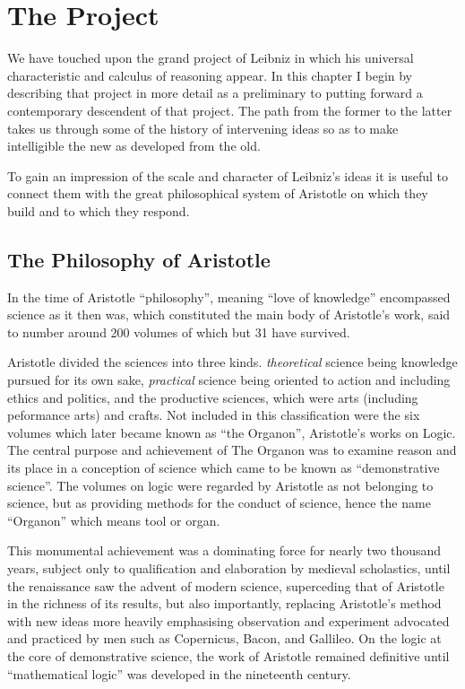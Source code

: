 
\chapter{The Project}\label{TheProject}

We have touched upon the grand project of Leibniz in which his universal characteristic
and calculus of reasoning appear.
In this chapter I begin by describing that project in more detail as a preliminary
to putting forward a contemporary descendent of that project.
The path from the former to the latter takes us through some of the history of
intervening ideas so as to make intelligible the new as developed from the old.

To gain an impression of the scale and character of Leibniz's ideas it is useful to connect them with
the great philosophical system of Aristotle on which they build and to which they respond.

\section{The Philosophy of Aristotle}

In the time of Aristotle ``philosophy'', meaning ``love of knowledge'' encompassed science as it then was, which constituted the main body of Aristotle's work, said to number around 200 volumes of which but 31 have survived.

Aristotle divided the sciences into three kinds.
\emph{theoretical} science being knowledge pursued for 
its own sake, \emph{practical} science being oriented to action and including ethics and politics, and
the productive sciences, which were arts (including peformance arts) and crafts.
Not included in this classification were the six volumes which later became known as ``the Organon'', Aristotle's
works on Logic.
The central purpose and achievement of The Organon was to examine reason and its place in a conception of science which came to be known as ``demonstrative science''.
The volumes on logic were regarded by Aristotle as not belonging to science, but as providing methods for the conduct of science, hence the name ``Organon'' which means tool or organ.

This monumental achievement was a dominating force for nearly two thousand years, subject only to qualification and elaboration by medieval scholastics, until the renaissance saw the advent of modern science, superceding that of Aristotle in the richness
of its results, but also importantly, replacing Aristotle's method with new ideas more heavily emphasising observation and experiment advocated and practiced by men such as Copernicus, Bacon, and Gallileo.
On the logic at the core of demonstrative science, the work of Aristotle remained definitive until ``mathematical logic'' was developed in the nineteenth century.

